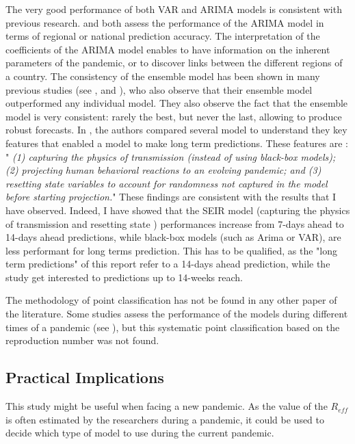 The very good performance of both VAR and ARIMA models is consistent with previous research. 
\cite{kufel2020arima} and \cite{shang2021regional} both assess the performance of the ARIMA model in terms of regional or national prediction accuracy. 
The interpretation of the coefficients of the ARIMA model enables to have information on the inherent parameters of the pandemic, or to discover links between the different regions of a country. 
The consistency of the ensemble model has been shown in many previous studies (see \cite{cramer2022evaluation}, \cite{VIBOUD201813} and \cite{reich2019accuracy}), who also observe that their ensemble model outperformed any individual model. 
They also observe the fact that the ensemble model is very consistent: rarely the best, but never the last, allowing to produce robust forecasts. 
In \cite{rahmandad2022enhancing}, the authors compared several model to understand they key features that enabled a model to make long term predictions. 
These features are : " \textit{(1) capturing the physics of transmission (instead of using black-box models); (2) projecting human behavioral reactions to an evolving pandemic; and (3) resetting state variables to account for randomness not captured in the model before starting projection.}"
These findings are consistent with the results that I have observed. 
Indeed, I have showed that the SEIR model (capturing the physics of transmission and resetting state ) performances increase from 7-days ahead to 14-days ahead predictions, while black-box models (such as Arima or VAR), are less performant for long terms prediction. 
This has to be qualified, as the "long term predictions" of this report refer to a 14-days ahead prediction, while the study \cite{rahmandad2022enhancing} get interested to predictions up to 14-weeks reach. 

The methodology of point classification has not be found in any other paper of the literature. 
Some studies assess the performance of the models during different times of a pandemic (see \cite{howerton2023evaluation}), but this systematic point classification based on the reproduction number was not found. 

\subsection{Practical Implications}

This study might be useful when facing a new pandemic.
As the value of the $R_{eff}$ is often estimated by the researchers during a pandemic, it could be used to decide which type of model to use during the current pandemic. 


